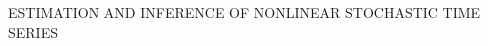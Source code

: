 \newpage
\thispagestyle{empty}
\centering
\null

\vfill
\Large
\uppercase{estimation and inference of nonlinear stochastic time series}
\vfill
